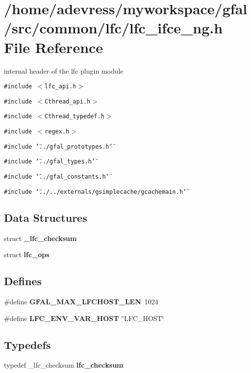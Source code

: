 \section{/home/adevress/myworkspace/gfal/src/common/lfc/lfc\_\-ifce\_\-ng.h File Reference}
\label{lfc__ifce__ng_8h}
internal header of the lfc plugin module 

{\tt \#include $<$lfc\_\-api.h$>$}\par
{\tt \#include $<$Cthread\_\-api.h$>$}\par
{\tt \#include $<$Cthread\_\-typedef.h$>$}\par
{\tt \#include $<$regex.h$>$}\par
{\tt \#include \char`\"{}../gfal\_\-prototypes.h\char`\"{}}\par
{\tt \#include \char`\"{}../gfal\_\-types.h\char`\"{}}\par
{\tt \#include \char`\"{}../gfal\_\-constants.h\char`\"{}}\par
{\tt \#include \char`\"{}../../externals/gsimplecache/gcachemain.h\char`\"{}}\par
\subsection*{Data Structures}
\begin{CompactItemize}
\item 
struct \textbf{\_\-lfc\_\-checksum}
\item 
struct \textbf{lfc\_\-ops}
\end{CompactItemize}
\subsection*{Defines}
\begin{CompactItemize}
\item 
\#define \textbf{GFAL\_\-MAX\_\-LFCHOST\_\-LEN}~1024\label{lfc__ifce__ng_8h_4ba01f362057d237e7234f527da40cdb}

\item 
\#define \textbf{LFC\_\-ENV\_\-VAR\_\-HOST}~\char`\"{}LFC\_\-HOST\char`\"{}\label{lfc__ifce__ng_8h_84a94dcd9eab9338b6c0158a51483274}

\end{CompactItemize}
\subsection*{Typedefs}
\begin{CompactItemize}
\item 
typedef \_\-lfc\_\-checksum \textbf{lfc\_\-checksum}\label{lfc__ifce__ng_8h_d86e20d6f06b763b9bbeec769a96651e}

\end{CompactItemize}
